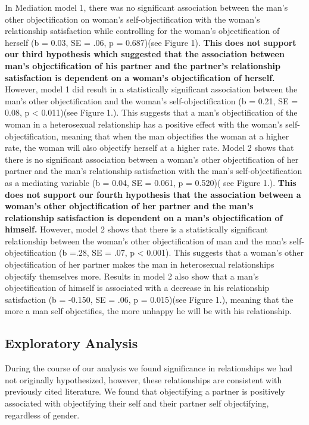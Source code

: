 \documentclass[
  english,
  man]{apa6}
\begin{document}
In Mediation model 1, there was no significant association between the man's other objectification on woman's self-objectification with the woman's relationship satisfaction while controlling for the woman's objectification of herself (b = 0.03, SE = .06, p = 0.687)(see Figure 1). \textbf{This does not support our third hypothesis which suggested that the association between man's objectification of his partner and the partner's relationship satisfaction is dependent on a woman's objectification of herself.} However, model 1 did result in a statistically significant association between the man's other objectification and the woman's self-objectification (b = 0.21, SE = 0.08, p \textless{} 0.011)(see Figure 1.). This suggests that a man's objectification of the woman in a heterosexual relationship has a positive effect with the woman's self-objectification, meaning that when the man objectifies the woman at a higher rate, the woman will also objectify herself at a higher rate.
Model 2 shows that there is no significant association between a woman's other objectification of her partner and the man's relationship satisfaction with the man's self-objectification as a mediating variable (b = 0.04, SE = 0.061, p = 0.520)( see Figure 1.). \textbf{This does not support our fourth hypothesis that the association between a woman's other objectification of her partner and the man's relationship satisfaction is dependent on a man's objectification of himself.} However, model 2 shows that there is a statistically significant relationship between the woman's other objectification of man and the man's self-objectification (b =.28, SE = .07, p \textless{} 0.001). This suggests that a woman's other objectification of her partner makes the man in heterosexual relationships objectify themselves more. Results in model 2 also show that a man's objectification of himself is associated with a decrease in his relationship satisfaction (b = -0.150, SE = .06, p = 0.015)(see Figure 1.), meaning that the more a man self objectifies, the more unhappy he will be with his relationship.

\hypertarget{exploratory-analysis}{%
\subsection{Exploratory Analysis}\label{exploratory-analysis}}

During the course of our analysis we found significance in relationships we had not originally hypothesized, however, these relationships are consistent with previously cited literature. We found that objectifying a partner is positively associated with objectifying their self and their partner self objectifying, regardless of gender.
\end{document}
